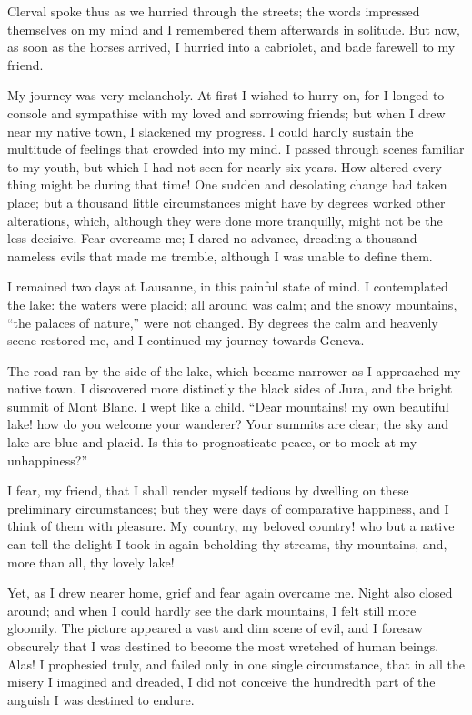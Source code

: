 \documentclass[12pt,openright]{book}
\begin{document}
Clerval spoke thus as we hurried through the streets; the words impressed themselves on my mind and I remembered them afterwards in solitude. But now, as soon as the horses arrived, I hurried into a cabriolet, and bade farewell to my friend.

My journey was very melancholy. At first I wished to hurry on, for I longed to console and sympathise with my loved and sorrowing friends; but when I drew near my native town, I slackened my progress. I could hardly sustain the multitude of feelings that crowded into my mind. I passed through scenes familiar to my youth, but which I had not seen for nearly six years. How altered every thing might be during that time! One sudden and desolating change had taken place; but a thousand little circumstances might have by degrees worked other alterations, which, although they were done more tranquilly, might not be the less decisive. Fear overcame me; I dared no advance, dreading a thousand nameless evils that made me tremble, although I was unable to define them.

I remained two days at Lausanne, in this painful state of mind. I contemplated the lake: the waters were placid; all around was calm; and the snowy mountains, “the palaces of nature,” were not changed. By degrees the calm and heavenly scene restored me, and I continued my journey towards Geneva.

The road ran by the side of the lake, which became narrower as I approached my native town. I discovered more distinctly the black sides of Jura, and the bright summit of Mont Blanc. I wept like a child. “Dear mountains! my own beautiful lake! how do you welcome your wanderer? Your summits are clear; the sky and lake are blue and placid. Is this to prognosticate peace, or to mock at my unhappiness?”

I fear, my friend, that I shall render myself tedious by dwelling on these preliminary circumstances; but they were days of comparative happiness, and I think of them with pleasure. My country, my beloved country! who but a native can tell the delight I took in again beholding thy streams, thy mountains, and, more than all, thy lovely lake!

Yet, as I drew nearer home, grief and fear again overcame me. Night also closed around; and when I could hardly see the dark mountains, I felt still more gloomily. The picture appeared a vast and dim scene of evil, and I foresaw obscurely that I was destined to become the most wretched of human beings. Alas! I prophesied truly, and failed only in one single circumstance, that in all the misery I imagined and dreaded, I did not conceive the hundredth part of the anguish I was destined to endure.
\end{document}
